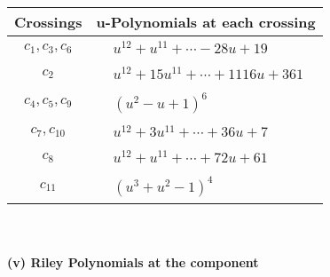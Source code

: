 \documentclass[1p]{elsarticle_modified}
\theoremstyle{definition}
\begin{document}
\begin{tabular}{m{50pt}|m{274pt}}
Crossings & \hspace{64pt}u-Polynomials at each crossing \\
\hline $$\begin{aligned}c_{1},c_{3},c_{6}\end{aligned}$$&$\begin{aligned}
&u^{12}+u^{11}+\cdots-28 u+19
\end{aligned}$\\
\hline $$\begin{aligned}c_{2}\end{aligned}$$&$\begin{aligned}
&u^{12}+15 u^{11}+\cdots+1116 u+361
\end{aligned}$\\
\hline $$\begin{aligned}c_{4},c_{5},c_{9}\end{aligned}$$&$\begin{aligned}
&(u^2- u+1)^6
\end{aligned}$\\
\hline $$\begin{aligned}c_{7},c_{10}\end{aligned}$$&$\begin{aligned}
&u^{12}+3 u^{11}+\cdots+36 u+7
\end{aligned}$\\
\hline $$\begin{aligned}c_{8}\end{aligned}$$&$\begin{aligned}
&u^{12}+u^{11}+\cdots+72 u+61
\end{aligned}$\\
\hline $$\begin{aligned}c_{11}\end{aligned}$$&$\begin{aligned}
&(u^3+u^2-1)^4
\end{aligned}$\\
\hline
\end{tabular}\\~\\
\newpage\renewcommand{\arraystretch}{1}
\flushleft \textbf{(v) Riley Polynomials at the component}\newline \\
\end{document}
